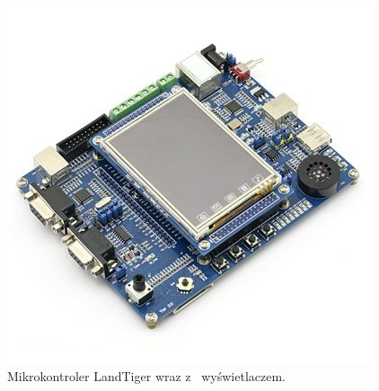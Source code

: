\documentclass{BscUS}
\begin{document}
\begin{figure}[h]
\centering
\includegraphics{./img/landTiger}
\caption{Mikrokontroler LandTiger wraz z~ wyświetlaczem. \cite{landtigerDesc}}
\end{figure}
\end{document}
